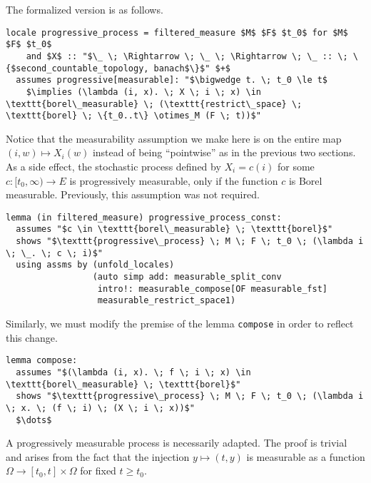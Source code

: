 The formalized version is as follows.

\begin{isadefinition}
{\small
\begin{lstlisting}[style=isabelle]
locale progressive_process = filtered_measure $M$ $F$ $t_0$ for $M$ $F$ $t_0$
	and $X$ :: "$\_ \; \Rightarrow \; \_ \; \Rightarrow \; \_ :: \; \{$second_countable_topology, banach$\}$" $+$
  assumes progressive[measurable]: "$\bigwedge t. \; t_0 \le t$
	$\implies (\lambda (i, x). \; X \; i \; x) \in \texttt{borel\_measurable} \; (\texttt{restrict\_space} \; \texttt{borel} \; \{t_0..t\} \otimes_M (F \; t))$"
\end{lstlisting}
}
\end{isadefinition}

Notice that the measurability assumption we make here is on the entire map $(i, w) \mapsto X_i(w)$ instead of being ``pointwise'' as in the previous two sections. As a side effect, the stochastic process defined by $X_i = c(i)$ for some $c : [t_0, \infty) \rightarrow E$ is progressively measurable, only if the function $c$ is Borel measurable. Previously, this assumption was not required.

\begin{isalemma}
{\small
\begin{lstlisting}[style=isabelle]
lemma (in filtered_measure) progressive_process_const:
  assumes "$c \in \texttt{borel\_measurable} \; \texttt{borel}$"
  shows "$\texttt{progressive\_process} \; M \; F \; t_0 \; (\lambda i \; \_. \; c \; i)$"
  using assms by (unfold_locales) 
				 (auto simp add: measurable_split_conv 
				  intro!: measurable_compose[OF measurable_fst] 
				  measurable_restrict_space1)
  \end{lstlisting}
}
\end{isalemma}

Similarly, we must modify the premise of the lemma \texttt{compose} in order to reflect this change.

\begin{isalemma}
{\small
\begin{lstlisting}[style=isabelle]
lemma compose:
  assumes "$(\lambda (i, x). \; f \; i \; x) \in \texttt{borel\_measurable} \; \texttt{borel}$"
  shows "$\texttt{progressive\_process} \; M \; F \; t_0 \; (\lambda i \; x. \; (f \; i) \; (X \; i \; x))$"
  $\dots$
  \end{lstlisting}
}
\end{isalemma}

A progressively measurable process is necessarily adapted. The proof is trivial and arises from the fact that the injection $y \mapsto (t, y)$ is measurable as a function $\Omega \rightarrow [t_0, t] \times \Omega$ for fixed $t \ge t_0$.


